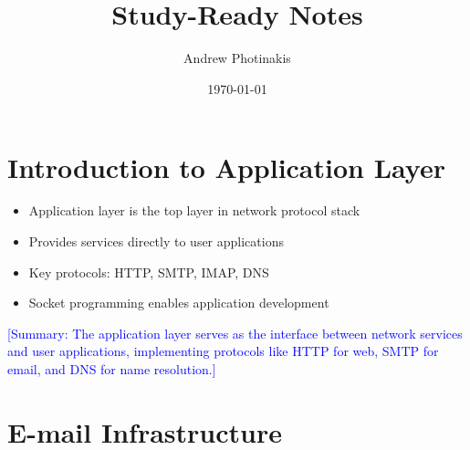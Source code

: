 \documentclass[12pt]{article}
\title{\TOPICTITLE\\\large Study-Ready Notes}
\author{Andrew Photinakis}
\date{\today}
\begin{document}
\maketitle
\tableofcontents


\newpage


\section{Introduction to Application Layer}
\begin{itemize}
    \item Application layer is the top layer in network protocol stack
    \item Provides services directly to user applications
    \item Key protocols: HTTP, SMTP, IMAP, DNS
    \item Socket programming enables application development
\end{itemize}

\textcolor{blue}{[Summary: The application layer serves as the interface between network services and user applications, implementing protocols like HTTP for web, SMTP for email, and DNS for name resolution.]}

\section{E-mail Infrastructure}
\end{document}
